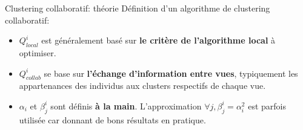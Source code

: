 \documentclass[hyperref={pdfpagelabels=false}]{beamer}
\begin{document}

    \begin{frame}{Clustering collaboratif: théorie}
        Définition d'un algorithme de clustering collaboratif:
        \begin{itemize}
            \item $Q^i_{local}$ est généralement basé sur \textbf{le critère de 
                l'algorithme local} à optimiser.
            \item $Q^i_{collab}$ se base sur \textbf{l'échange d'information 
                entre vues}, typiquement les appartenances des individus aux 
                clusters respectifs de chaque vue.
            \item $\alpha_i$ et $\beta_j^i$ sont définis \textbf{à la main}.  
                L'approximation $\forall j, \beta_j^i = \alpha_i^2$ est parfois 
                utilisée car donnant de bons résultats en pratique.
        \end{itemize}
    \end{frame}
\end{document}

